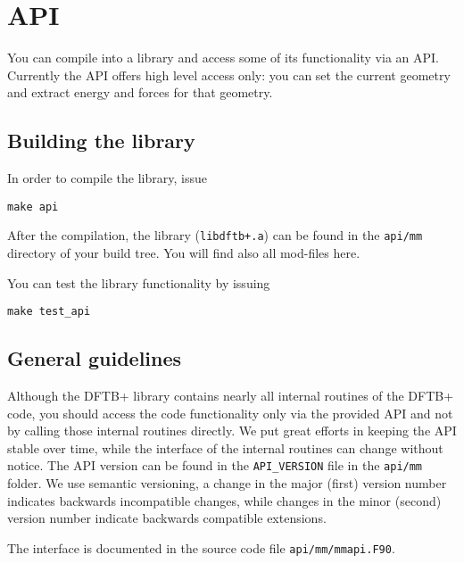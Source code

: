 \chapter{\dftbp{} API}

You can compile \dftbp{} into a library and access some of its functionality via
an API. Currently the API offers high level access only: you can set the current
geometry and extract energy and forces for that geometry.

\section{Building the library}

In order to compile the \dftbp{} library, issue
\begin{verbatim}
make api
\end{verbatim}
After the compilation, the library (\verb|libdftb+.a|) can be found in the
\verb|api/mm| directory of your build tree. You will find also all mod-files
here.

You can test the library functionality by issuing
\begin{verbatim}
make test_api
\end{verbatim}


\section{General guidelines}

Although the DFTB+ library contains nearly all internal routines of the DFTB+
code, you should access the code functionality only via the provided API and not
by calling those internal routines directly. We put great efforts in keeping the
API stable over time, while the interface of the internal routines can change
without notice. The API version can be found in the \verb|API_VERSION| file in
the \verb|api/mm| folder. We use semantic versioning, a change in the major
(first) version number indicates backwards incompatible changes, while changes
in the minor (second) version number indicate backwards compatible extensions.

The interface is documented in the source code file
\verb|api/mm/mmapi.F90|.
